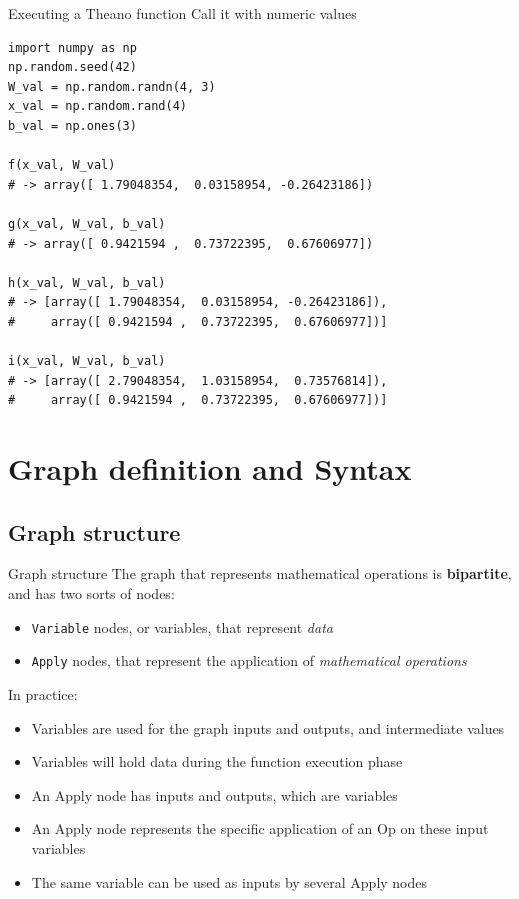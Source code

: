 \documentclass[a4paper,9pt]{beamer}
\begin{document}
\begin{frame}[fragile]{Executing a Theano function}
  Call it with numeric values
\small
  \begin{verbatim}
import numpy as np
np.random.seed(42)
W_val = np.random.randn(4, 3)
x_val = np.random.rand(4)
b_val = np.ones(3)

f(x_val, W_val)
# -> array([ 1.79048354,  0.03158954, -0.26423186])

g(x_val, W_val, b_val)
# -> array([ 0.9421594 ,  0.73722395,  0.67606977])

h(x_val, W_val, b_val)
# -> [array([ 1.79048354,  0.03158954, -0.26423186]),
#     array([ 0.9421594 ,  0.73722395,  0.67606977])]

i(x_val, W_val, b_val)
# -> [array([ 2.79048354,  1.03158954,  0.73576814]),
#     array([ 0.9421594 ,  0.73722395,  0.67606977])]
  \end{verbatim}
\end{frame}

\section{Graph definition and Syntax}
\begin{frame}
  \tableofcontents[currentsection]
\end{frame}

\subsection{Graph structure}
\begin{frame}[fragile]{Graph structure}
  The graph that represents mathematical operations is {\bf bipartite},
  and has two sorts of nodes:
  \begin{itemize}
    \item \verb|Variable| nodes, or variables, that represent {\em data}
    \item \verb|Apply| nodes, that represent the application of
      {\em mathematical operations}
  \end{itemize}
  In practice:
  \begin{itemize}
    \item Variables are used for the graph inputs and outputs, and intermediate values
    \item Variables will hold data during the function execution phase
    \item An Apply node has inputs and outputs, which are variables
    \item An Apply node represents the specific application of an Op on these input variables
    \item The same variable can be used as inputs by several Apply nodes
  \end{itemize}
\end{frame}
\end{document}

